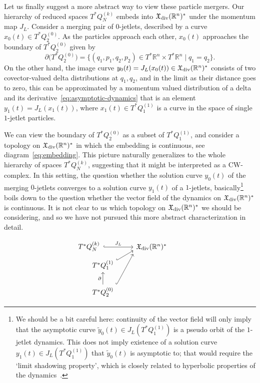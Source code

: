 \documentclass[12pt]{amsart}
\newcommand{\R}{\ensuremath{\mathbb{R}}}
\begin{document}
Let us finally suggest a more abstract way to view these particle
mergers. Our hierarchy of reduced spaces $T^*Q_N^{(k)}$ embeds into
$\mathfrak{X}_{\rm div}(\R^n)^*$ under the momentum map $J_L$.
Consider a merging pair of $0$-jetlets, described by a curve
$x_0(t) \in T^*Q_2^{(0)}$. As the particles approach each other,
$x_0(t)$ approaches the boundary of $T^*Q_2^{(0)}$ given by
\begin{equation}\label{eq:boundary}
  \partial\big( T^*Q_2^{(0)} \big)
  = \{ (q_1,p_1,q_2,p_2) \in T^* \R^n \times T^* \R^n \mid q_1 = q_2 \}.
\end{equation}
On the other hand, the image curve
$y_0(t) = J_L(x_0(t)) \in \mathfrak{X}_{\rm div}(\R^n)^*$ consists of
two covector-valued delta distributions at $q_1,q_2$, and in the limit
as their distance goes to zero, this can be approximated by a momentum
valued distribution of a delta and its
derivative~\eqref{eq:asymptotic-dynamics} that is an element
$y_1(t) = J_L(x_1(t))$, where $x_1(t) \in T^*Q_1^{(1)}$ is a curve in
the space of single $1$-jetlet particles.

We can view the boundary of $T^*Q_2^{(0)}$ as a subset of $T^*Q_1^{(1)}$,
and consider a topology on $\mathfrak{X}_{\rm div}(\mathbb{R}^n)^*$ in which
the embedding is continuous,
see diagram~\eqref{eq:embedding}.
This picture naturally generalizes to the whole hierarchy of spaces
$T^*Q_N^{(k)}$, suggesting that it might be interpreted as a
CW-complex. In this setting, the question whether the solution curve
$y_0(t)$ of the merging $0$-jetlets converges to a solution curve
$y_1(t)$ of a $1$-jetlets, basically\footnote{%
  We should be a bit careful here: continuity of the vector field will
  only imply that the asymptotic curve $\tilde{y}_0(t) \in J_L(T^*Q_1^{(1)})$
  is a pseudo orbit of the $1$-jetlet dynamics. This does not imply
  existence of a solution curve $y_1(t) \in J_L(T^*Q_1^{(1)})$ that
  $\tilde{y}_0(t)$ is asymptotic to; that would require the `limit
  shadowing property', which is closely related to hyperbolic
  properties of the dynamics~\cite{Ribeiro2014}.%
} boils down to the question whether the vector field of the dynamics
on $\mathfrak{X}_{\rm div}(\R^n)^*$ is continuous.
It is not clear to us which topology on $\mathfrak{X}_{\rm div}(\R^n)^*$ we should
be considering, and so we have not pursued
this more abstract characterization in detail.

\begin{equation}\label{eq:embedding}
  \begin{tikzcd}
    \hspace{-4em}
    T^*Q_N^{(k)} \ar[to=1-2,hook, "J_L"] & \mathfrak{X}_{\rm div}(\R^n)^* \\[-1.2em]
    T^*Q_1^{(1)} \ar[to=1-2,hook,start anchor={[yshift=-0.4em]north east},end anchor={[yshift=-0.5em]west}] \\
    T^*Q_2^{(0)} \ar[to=1-2,hook,start anchor=north east,end anchor={[yshift=-1.0em]west}]
                 \ar[u,"\partial"] &
  \end{tikzcd}
\end{equation}
\end{document}

